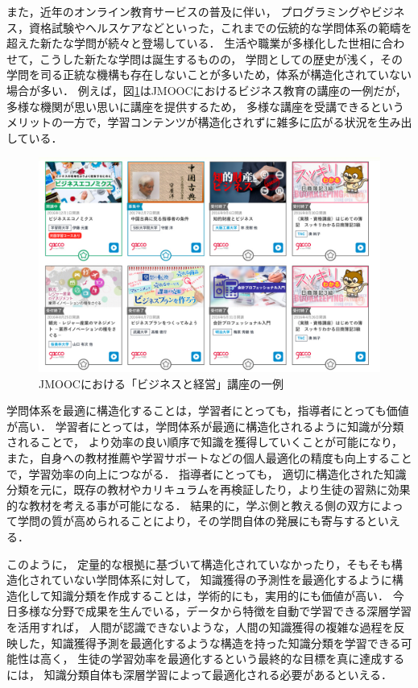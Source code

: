 また，近年のオンライン教育サービスの普及に伴い，
プログラミングやビジネス，資格試験やヘルスケアなどといった，これまでの伝統的な学問体系の範疇を超えた新たな学問が続々と登場している．
生活や職業が多様化した世相に合わせて，こうした新たな学問は誕生するものの，
学問としての歴史が浅く，その学問を司る正統な機構も存在しないことが多いため，体系が構造化されていない場合が多い．
例えば，図\ref{fig:business}はJMOOCにおけるビジネス教育の講座の一例だが，多様な機関が思い思いに講座を提供するため，
多様な講座を受講できるというメリットの一方で，学習コンテンツが構造化されずに雑多に広がる状況を生み出している．

\begin{figure}[htb]
\begin{center}
\includegraphics[width=400pt]{./img/business.pdf}
\end{center}
\caption{JMOOCにおける「ビジネスと経営」講座の一例}
\label{fig:business}
\end{figure}


学問体系を最適に構造化することは，学習者にとっても，指導者にとっても価値が高い．
学習者にとっては，学問体系が最適に構造化されるように知識が分類されることで，
より効率の良い順序で知識を獲得していくことが可能になり，
また，自身への教材推薦や学習サポートなどの個人最適化の精度も向上することで，学習効率の向上につながる．
指導者にとっても，
適切に構造化された知識分類を元に，既存の教材やカリキュラムを再検証したり，より生徒の習熟に効果的な教材を考える事が可能になる．
結果的に，学ぶ側と教える側の双方によって学問の質が高められることにより，その学問自体の発展にも寄与するといえる．

このように，
定量的な根拠に基づいて構造化されていなかったり，そもそも構造化されていない学問体系に対して，
知識獲得の予測性を最適化するように構造化して知識分類を作成することは，学術的にも，実用的にも価値が高い．
今日多様な分野で成果を生んでいる，データから特徴を自動で学習できる深層学習を活用すれば，
人間が認識できないような，人間の知識獲得の複雑な過程を反映した，知識獲得予測を最適化するような構造を持った知識分類を学習できる可能性は高く，
生徒の学習効率を最適化するという最終的な目標を真に達成するには，
知識分類自体も深層学習によって最適化される必要があるといえる．



